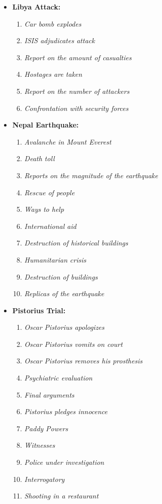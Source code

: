 \begin{itemize}
  \item {\bf Libya Attack:}
  \begin{enumerate}
    \item {\it Car bomb explodes}
    \item {\it ISIS adjudicates attack}
    \item {\it Report on the amount of casualties}
    \item {\it Hostages are taken}
    \item {\it Report on the number of attackers}
    \item {\it Confrontation with security forces}
  \end{enumerate}
  \item {\bf Nepal Earthquake:}
  \begin{enumerate}
    \item {\it Avalanche in Mount Everest}
    \item {\it Death toll}
    \item {\it Reports on the magnitude of the earthquake}
    \item {\it Rescue of people}
    \item {\it Ways to help}
    \item {\it International aid}
    \item {\it Destruction of historical buildings}
    \item {\it Humanitarian crisis}
    \item {\it Destruction of buildings}
    \item {\it Replicas of the earthquake}
  \end{enumerate}
  \item {\bf Pistorius Trial:}
  \begin{enumerate}
    \item {\it Oscar Pistorius apologizes}
    \item {\it Oscar Pistorius vomits on court}
    \item {\it Oscar Pistorius removes his prosthesis}
    \item {\it Psychiatric evaluation}
    \item {\it Final arguments}
    \item {\it Pistorius pledges innocence}
    \item {\it Paddy Powers}
    \item {\it Witnesses}
    \item {\it Police under investigation}
    \item {\it Interrogatory}
    \item {\it Shooting in a restaurant}
  \end{enumerate}
\end{itemize}

